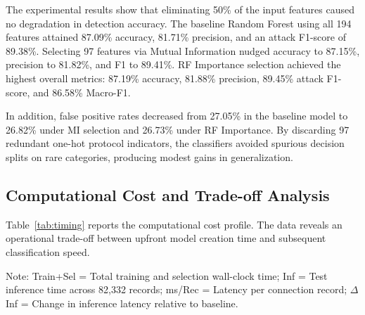 \documentclass[conference]{IEEEtran}
\begin{document}
The experimental results show that eliminating 50\% of the input features caused no degradation in detection accuracy. The baseline Random Forest using all 194 features attained 87.09\% accuracy, 81.71\% precision, and an attack F1-score of 89.38\%. Selecting 97 features via Mutual Information nudged accuracy to 87.15\%, precision to 81.82\%, and F1 to 89.41\%. RF Importance selection achieved the highest overall metrics: 87.19\% accuracy, 81.88\% precision, 89.45\% attack F1-score, and 86.58\% Macro-F1. 

In addition, false positive rates decreased from 27.05\% in the baseline model to 26.82\% under MI selection and 26.73\% under RF Importance. By discarding 97 redundant one-hot protocol indicators, the classifiers avoided spurious decision splits on rare categories, producing modest gains in generalization.

\subsection{Computational Cost and Trade-off Analysis}
Table~\ref{tab:timing} reports the computational cost profile. The data reveals an operational trade-off between upfront model creation time and subsequent classification speed.

\begin{table}[htbp]
\caption{Computational Cost Profile and Inference Latency}
\begin{center}
\end{center}
\vspace{-2mm}
\parbox{\columnwidth}{\footnotesize Note: Train+Sel = Total training and selection wall-clock time; Inf = Test inference time across 82,332 records; ms/Rec = Latency per connection record; $\Delta$ Inf = Change in inference latency relative to baseline.}
\label{tab:timing}
\end{table}
\end{document}
